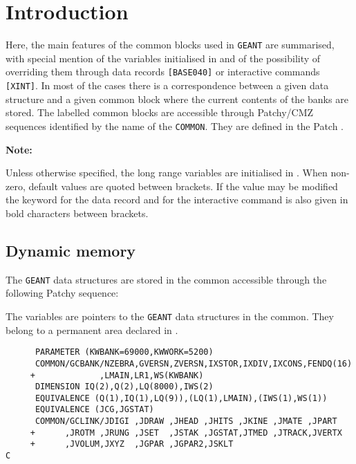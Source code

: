       
  

\section{Introduction}
 
Here, the
main features of the common blocks used in {\tt GEANT} are summarised,
with special mention of the variables initialised in 
and of the possibility of overriding them through data records
{\tt [BASE040]} or interactive commands {\tt [XINT]}.
In most of the cases there is a correspondence between a
given data structure and a given common block where the current contents of
the banks are stored.
The labelled common blocks are accessible through Patchy/CMZ sequences
identified by the name of the {\tt COMMON}. They are defined in the Patch
.
 
{\bf Note:}
 
Unless otherwise specified, the long range variables are
initialised in . When non-zero, default values are
quoted between brackets. If the value may be modified
the keyword for the data record and for the interactive
command is also given in bold characters between brackets.
 
\subsection{Dynamic memory}
 
The {\tt GEANT} data structures are stored in the
common  accessible through the following Patchy sequence:

The  variables are pointers to the {\tt GEANT} data structures 
in the  common. They belong to a permanent area declared in 
.
\begin{verbatim}
      PARAMETER (KWBANK=69000,KWWORK=5200)
      COMMON/GCBANK/NZEBRA,GVERSN,ZVERSN,IXSTOR,IXDIV,IXCONS,FENDQ(16)
     +             ,LMAIN,LR1,WS(KWBANK)
      DIMENSION IQ(2),Q(2),LQ(8000),IWS(2)
      EQUIVALENCE (Q(1),IQ(1),LQ(9)),(LQ(1),LMAIN),(IWS(1),WS(1))
      EQUIVALENCE (JCG,JGSTAT)
      COMMON/GCLINK/JDIGI ,JDRAW ,JHEAD ,JHITS ,JKINE ,JMATE ,JPART
     +      ,JROTM ,JRUNG ,JSET  ,JSTAK ,JGSTAT,JTMED ,JTRACK,JVERTX
     +      ,JVOLUM,JXYZ  ,JGPAR ,JGPAR2,JSKLT
C
\end{verbatim}
